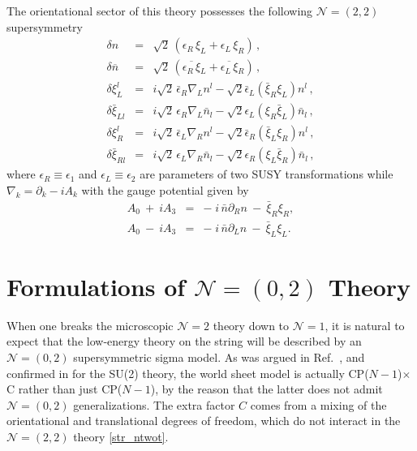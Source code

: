 \documentclass[12pt]{article}
\def\beqn{\begin{eqnarray}}
\def\eeqn{\end{eqnarray}}
\newcommand{\ntwo}{${\mathcal N}=2$ }
\newcommand{\ntwot}{${\mathcal N}= \left(2,2\right) $ }
\newcommand{\ntwoo}{${\mathcal N}= \left(0,2\right) $ }
\newcommand{\nonen}{${\mathcal N}=1$}
\newcommand{\p}{\partial}
\newcommand{\ov}{\overline}
\newcommand{\nbar}{\ov{n}}
\newcommand{\CPC}{CP($N-1$)$\times$C }
\begin{document}
	The orientational sector of this theory possesses the following \ntwot supersymmetry
\beqn
\delta n & = & \sqrt{2}\, (\epsilon_R\, \xi_L+\epsilon_L\, \xi_R)\,,
\nonumber\\[3mm]
\delta \nbar & = &  \sqrt{2}\,( \ov{\epsilon_R\, \xi}{}_L+ \ov{\epsilon_L\, \xi}{}_R)\,,
\nonumber\\[3mm]
\delta \xi^l_L & = & i\sqrt{2}\,\bar{\epsilon}_R\nabla_L n^l 
-\sqrt{2}\bar{\epsilon}_L(\bar{\xi}_R\xi_L)n^l\,,
\nonumber\\[3mm]
\delta \bar{\xi}_{Ll} & = & i\sqrt{2}\,\epsilon_R\nabla_L \bar{n}_l 
-\sqrt{2}\epsilon_L(\xi_R\bar{\xi}_L)\bar{n}_l\,,
\nonumber\\[3mm]
\delta \xi^l_R & = & i\sqrt{2}\,\bar{\epsilon}_L\nabla_R n^l 
-\sqrt{2}\bar{\epsilon}_R(\bar{\xi}_L\xi_R)n^l\,,
\nonumber\\[3mm]
\delta \bar{\xi}_{Rl} & = & i\sqrt{2}\,\epsilon_L\nabla_R \bar{n}_l 
-\sqrt{2}\epsilon_R(\xi_L\bar{\xi}_R)\bar{n}_l\,,
\label{susy_ntwot}
\eeqn
where $\epsilon_R\equiv\epsilon_1$ and $\epsilon_L\equiv\epsilon_2$ are parameters of 
two SUSY transformations while $\nabla_k=\p_k-iA_k$ with the gauge potential  given by
\beqn
A_0~+~ iA_3 & = & -\;i\,\bar{n}\p_R n ~-~ \bar{\xi}_R\xi_R,
\nonumber\\[3mm]
A_0~-~ iA_3 & = & -\;i\,\bar{n}\p_L n ~-~ \bar{\xi}_L\xi_L.
\eeqn



%
%
\section{Formulations of \boldmath\ntwoo Theory}
\label{FT}
\setcounter{equation}{0}

	When one breaks the microscopic \ntwo theory down to \nonen, it is natural to expect
that the low-energy theory on the string will be described by an \ntwoo supersymmetric sigma model.
As was argued in Ref.~\cite{Edalati}, and confirmed in \cite{SYhet} for the SU(2) theory,
the world sheet model is actually \CPC rather than just CP($N-1$), by the reason
that the latter does not admit \ntwoo generalizations. 
The extra factor  $C$ comes from a mixing of the orientational and translational degrees of
freedom, which do not interact in the \ntwot theory \eqref{str_ntwot}.
\end{document}
